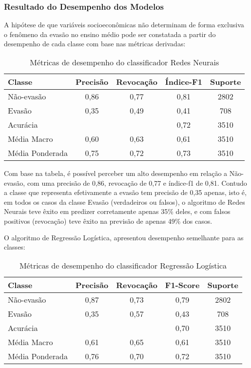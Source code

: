 \documentclass[english, spanish, brazilian]{RBIEarticle} %
\begin{document}
\subsubsection{Resultado do Desempenho dos Modelos}
A hipótese de que variáveis socioeconômicas não determinam de forma exclusiva o fenômeno da evasão no ensino médio pode ser constatada a partir do desempenho de cada classe com base nas métricas derivadas:

\vspace{0.5cm}
\begin{table}[htbp]
\centering
\label{tab:metricas}
\begin{tabular}{lcccc}
\hline
Classe        & Precisão & Revocação & Índice-F1 & Suporte \\ \hline
Não-evasão           & 0,86     & 0,77      & 0,81     & 2802    \\
Evasão           & 0,35     & 0,49      & 0,41     & 708     \\ \hline
Acurácia      &          &           & 0,72     & 3510    \\
Média Macro   & 0,60     & 0,63      & 0,61     & 3510    \\
Média Ponderada & 0,75   & 0,72      & 0,73     & 3510    \\ \hline
\end{tabular}
\caption{Métricas de desempenho do classificador Redes Neurais}
\end{table}
\vspace{0.5cm}

Com base na tabela, é possível perceber um alto desempenho em relação a Não-evasão, com uma precisão de 0,86, revocação de 0,77 e índice-f1 de 0,81. Contudo a classe que representa efetivamente a evasão tem precisão de 0,35 apenas, isto é, em todos os casos da classe Evasão (verdadeiros ou falsos), o algoritmo de Redes Neurais teve êxito em predizer corretamente apenas 35\% deles, e com falsos positivos (revocação) teve êxito na previsão de apenas 49\% dos casos. 

O algoritmo de Regressão Logística, apresentou desempenho semelhante para as classes:

\vspace{0.5cm}
\begin{table}[htbp]
\centering
\label{tab:metricas}
\begin{tabular}{lcccc}
\hline
Classe        & Precisão & Revocação & F1-Score & Suporte \\ \hline
Não-evasão           & 0,87     & 0,73      & 0,79     & 2802    \\
Evasão           & 0,35     & 0,57      & 0,43     & 708     \\ \hline
Acurácia      &          &           & 0,70     & 3510    \\
Média Macro   & 0,61     & 0,65      & 0,61     & 3510    \\
Média Ponderada & 0,76   & 0,70      & 0,72     & 3510    \\ \hline
\end{tabular}
\caption{Métricas de desempenho do classificador Regressão Logística}
\end{table}
\vspace{0.5cm}
\end{document}
